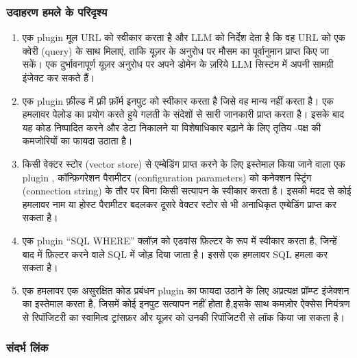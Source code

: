 \documentclass[
]{article}
\providecommand{\tightlist}{%
  \setlength{\itemsep}{0pt}\setlength{\parskip}{0pt}}
\begin{document}
\subsubsection{उदाहरण हमले के
परिदृश्य}\label{ux909ux926ux939ux930ux923-ux939ux92eux932-ux915-ux92aux930ux926ux936ux92f}

\begin{enumerate}
\def\labelenumi{\arabic{enumi}.}
\tightlist
\item
  एक plugin मूल URL को स्वीकार करता है और LLM को निर्देश देता है कि वह URL को
  एक क्वेरी (query) के साथ मिलाएं, ताकि यूज़र के अनुरोध पर मौसम का पूर्वानुमान
  प्राप्त किए जा सकें। एक दुर्भावनापूर्ण यूज़र अनुरोध पर अपने डोमेन के ज़रिये LLM सिस्टम
  में अपनी सामग्री इंजेक्ट कर सकते हैं।
\item
  एक plugin फ़ील्ड में फ़्री फ़ॉर्म इनपुट को स्वीकार करता है जिसे वह मान्य नहीं करता
  है। एक हमलावर पेलोड का प्रयोग करते हुये गलती के संदेशों से सारी जानकारी प्राप्त
  करता है। इसके बाद यह कोड निष्पादित करने और डेटा निकालने या विशेषाधिकार बढ़ाने के
  लिए तृतिय -पक्ष की कमजोरियों का फायदा उठाता है।
\item
  किसी वेक्टर स्टोर (vector store) से एम्बेडिंग प्राप्त करने के लिए इस्तेमाल किया जाने
  वाला एक plugin , कॉन्फ़िगरेशन पैरामीटर (configuration parameters) को कनेक्शन
  स्ट्रिंग (connection string) के तौर पर बिना किसी सत्यापन के स्वीकार करता है।
  इसकी मदद से कोई हमलावर नाम या होस्ट पैरामीटर बदलकर दूसरे वेक्टर स्टोर से भी
  अनाधिकृत एम्बेडिंग प्राप्त कर सकता है।
\item
  एक plugin ``SQL WHERE'' क्लॉज़ को एडवांस फ़िल्टर के रूप में स्वीकार करता है, जिन्हें
  बाद में फ़िल्टर करने वाले SQL में जोड़ दिया जाता है। इससे एक हमलावर SQL हमला कर
  सकता है।
\item
  एक हमलावर एक असुरक्षित कोड प्रबंधन plugin का फायदा उठाने के लिए अप्रत्यक्ष
  प्रॉम्प्ट इंजेक्शन का इस्तेमाल करता है, जिसमें कोई इनपुट सत्यापन नहीं होता है,इसके साथ
  कमज़ोर ऐक्सेस नियंत्रण से रिपॉजिटरी का स्वामित्व ट्रांसफ़र और यूज़र को उनकी
  रिपॉजिटरी से लॉक किया जा सकता है।
\end{enumerate}

\subsubsection{संदर्भ लिंक}\label{ux938ux926ux930ux92d-ux932ux915}
\end{document}
